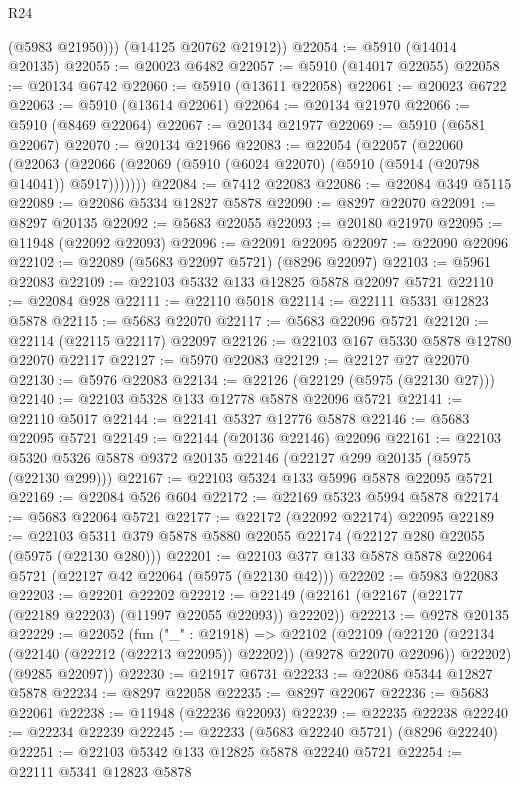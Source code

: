 \begin{lexlean}{R24}
\begin{coremodule}
          (@5983 @21950)))
      (@14125 @20762 @21912))
@22054 := @5910 (@14014 @20135)
@22055 := @20023 @6482
@22057 := @5910 (@14017 @22055)
@22058 := @20134 @6742
@22060 := @5910 (@13611 @22058)
@22061 := @20023 @6722
@22063 := @5910 (@13614 @22061)
@22064 := @20134 @21970
@22066 := @5910 (@8469 @22064)
@22067 := @20134 @21977
@22069 := @5910 (@6581 @22067)
@22070 := @20134 @21966
@22083 := @22054
    (@22057
      (@22060
        (@22063 (@22066 (@22069 (@5910 (@6024 @22070) (@5910 (@5914 (@20798 @14041)) @5917)))))))
@22084 := @7412 @22083
@22086 := @22084 @349 @5115
@22089 := @22086 @5334 @12827 @5878
@22090 := @8297 @22070
@22091 := @8297 @20135
@22092 := @5683 @22055
@22093 := @20180 @21970
@22095 := @11948 (@22092 @22093)
@22096 := @22091 @22095
@22097 := @22090 @22096
@22102 := @22089 (@5683 @22097 @5721) (@8296 @22097)
@22103 := @5961 @22083
@22109 := @22103 @5332 @133 @12825 @5878 @22097 @5721
@22110 := @22084 @928
@22111 := @22110 @5018
@22114 := @22111 @5331 @12823 @5878
@22115 := @5683 @22070
@22117 := @5683 @22096 @5721
@22120 := @22114 (@22115 @22117) @22097
@22126 := @22103 @167 @5330 @5878 @12780 @22070 @22117
@22127 := @5970 @22083
@22129 := @22127 @27 @22070
@22130 := @5976 @22083
@22134 := @22126 (@22129 (@5975 (@22130 @27)))
@22140 := @22103 @5328 @133 @12778 @5878 @22096 @5721
@22141 := @22110 @5017
@22144 := @22141 @5327 @12776 @5878
@22146 := @5683 @22095 @5721
@22149 := @22144 (@20136 @22146) @22096
@22161 := @22103 @5320 @5326 @5878 @9372 @20135 @22146 (@22127 @299 @20135 (@5975 (@22130 @299)))
@22167 := @22103 @5324 @133 @5996 @5878 @22095 @5721
@22169 := @22084 @526 @604
@22172 := @22169 @5323 @5994 @5878
@22174 := @5683 @22064 @5721
@22177 := @22172 (@22092 @22174) @22095
@22189 := @22103 @5311 @379 @5878 @5880 @22055 @22174 (@22127 @280 @22055 (@5975 (@22130 @280)))
@22201 := @22103 @377 @133 @5878 @5878 @22064 @5721 (@22127 @42 @22064 (@5975 (@22130 @42)))
@22202 := @5983 @22083
@22203 := @22201 @22202
@22212 := @22149 (@22161 (@22167 (@22177 (@22189 @22203) (@11997 @22055 @22093)) @22202))
@22213 := @9278 @20135
@22229 := @22052
    (fun ("_" : @21918) =>
    @22102
      (@22109
        (@22120 (@22134 (@22140 (@22212 (@22213 @22095)) @22202)) (@9278 @22070 @22096))
        @22202)
      (@9285 @22097))
@22230 := @21917 @6731
@22233 := @22086 @5344 @12827 @5878
@22234 := @8297 @22058
@22235 := @8297 @22067
@22236 := @5683 @22061
@22238 := @11948 (@22236 @22093)
@22239 := @22235 @22238
@22240 := @22234 @22239
@22245 := @22233 (@5683 @22240 @5721) (@8296 @22240)
@22251 := @22103 @5342 @133 @12825 @5878 @22240 @5721
@22254 := @22111 @5341 @12823 @5878

\end{coremodule}
\end{lexlean}
